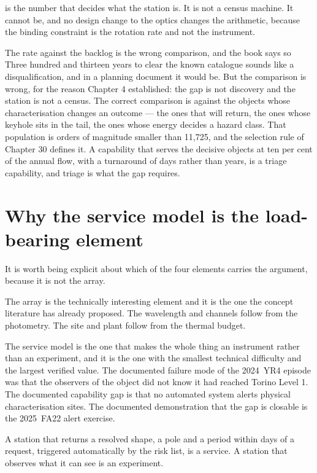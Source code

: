  is the number that decides what the station is. It is
not a census machine. It cannot be, and no design change to the optics
changes the arithmetic, because the binding constraint is the rotation rate
and not the instrument.

\begin{deeper}{The rate against the backlog is the wrong comparison, and the
book says so}
Three hundred and thirteen years to clear the known catalogue sounds like a
disqualification, and in a planning document it would be. But the comparison
is wrong, for the reason Chapter 4 established: the gap is not discovery and
the station is not a census. The correct comparison is against the objects
whose characterisation changes an outcome --- the ones that will return, the
ones whose keyhole sits in the tail, the ones whose energy decides a
hazard class. That population is orders of magnitude smaller than 11,725,
and the selection rule of Chapter 30 defines it. A capability that serves
the decisive objects at ten per cent of the annual flow, with a turnaround
of days rather than years, is a triage capability, and triage is what the
gap requires.
\end{deeper}

\section{Why the service model is the load-bearing element}

It is worth being explicit about which of the four elements carries the
argument, because it is not the array.

The array is the technically interesting element and it is the one the
concept literature has already proposed. The wavelength and channels follow
from the photometry. The site and plant follow from the thermal budget.

The service model is the one that makes the whole thing an instrument rather
than an experiment, and it is the one with the smallest technical difficulty
and the largest verified value. The documented failure mode of the 2024~YR4
episode was that the observers of the object did not know it had reached
Torino Level 1. The documented capability gap is that no automated system
alerts physical characterisation sites. The documented demonstration that
the gap is closable is the 2025~FA22 alert exercise.

A station that returns a resolved shape, a pole and a period within days
of a request, triggered automatically by the risk list, is a service. A
station that observes what it can see is an experiment.


